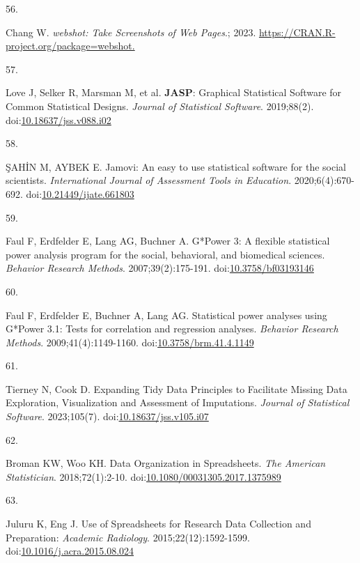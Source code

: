 \documentclass[
]{book}
\newlength{\cslhangindent}
\newlength{\csllabelwidth}
\newlength{\cslentryspacingunit} %
\newenvironment{CSLReferences}[2] %
 {%
  \setlength{\parindent}{0pt}
  \ifodd #1
  \let\oldpar\par
  \def\par{\hangindent=\cslhangindent\oldpar}
  \fi
  \setlength{\parskip}{#2\cslentryspacingunit}
 }%
 {}
\newcommand{\CSLLeftMargin}[1]{\parbox[t]{\csllabelwidth}{#1}}
\newcommand{\CSLRightInline}[1]{\parbox[t]{\linewidth - \csllabelwidth}{#1}\break}
\begin{document}
\begin{CSLReferences}{0}{0}
\leavevmode{}%
\CSLLeftMargin{56. }%
\CSLRightInline{Chang W. \emph{{webshot}: Take Screenshots of Web Pages}.; 2023. \href{https://CRAN.R-project.org/package=webshot}{https://CRAN.R-project.org/package=webshot.}}

\leavevmode{}%
\CSLLeftMargin{57. }%
\CSLRightInline{Love J, Selker R, Marsman M, et al. {\textbf{JASP}}: Graphical Statistical Software for Common Statistical Designs. \emph{Journal of Statistical Software}. 2019;88(2). doi:\href{https://doi.org/10.18637/jss.v088.i02}{10.18637/jss.v088.i02}}

\leavevmode{}%
\CSLLeftMargin{58. }%
\CSLRightInline{ŞAHİN M, AYBEK E. Jamovi: An easy to use statistical software for the social scientists. \emph{International Journal of Assessment Tools in Education}. 2020;6(4):670-692. doi:\href{https://doi.org/10.21449/ijate.661803}{10.21449/ijate.661803}}

\leavevmode{}%
\CSLLeftMargin{59. }%
\CSLRightInline{Faul F, Erdfelder E, Lang AG, Buchner A. G*Power 3: A flexible statistical power analysis program for the social, behavioral, and biomedical sciences. \emph{Behavior Research Methods}. 2007;39(2):175-191. doi:\href{https://doi.org/10.3758/bf03193146}{10.3758/bf03193146}}

\leavevmode{}%
\CSLLeftMargin{60. }%
\CSLRightInline{Faul F, Erdfelder E, Buchner A, Lang AG. Statistical power analyses using G*Power 3.1: Tests for correlation and regression analyses. \emph{Behavior Research Methods}. 2009;41(4):1149-1160. doi:\href{https://doi.org/10.3758/brm.41.4.1149}{10.3758/brm.41.4.1149}}

\leavevmode{}%
\CSLLeftMargin{61. }%
\CSLRightInline{Tierney N, Cook D. Expanding Tidy Data Principles to Facilitate Missing Data Exploration, Visualization and Assessment of Imputations. \emph{Journal of Statistical Software}. 2023;105(7). doi:\href{https://doi.org/10.18637/jss.v105.i07}{10.18637/jss.v105.i07}}

\leavevmode{}%
\CSLLeftMargin{62. }%
\CSLRightInline{Broman KW, Woo KH. Data Organization in Spreadsheets. \emph{The American Statistician}. 2018;72(1):2-10. doi:\href{https://doi.org/10.1080/00031305.2017.1375989}{10.1080/00031305.2017.1375989}}

\leavevmode{}%
\CSLLeftMargin{63. }%
\CSLRightInline{Juluru K, Eng J. Use of Spreadsheets for Research Data Collection and Preparation: \emph{Academic Radiology}. 2015;22(12):1592-1599. doi:\href{https://doi.org/10.1016/j.acra.2015.08.024}{10.1016/j.acra.2015.08.024}}


\end{CSLReferences}
\end{document}
